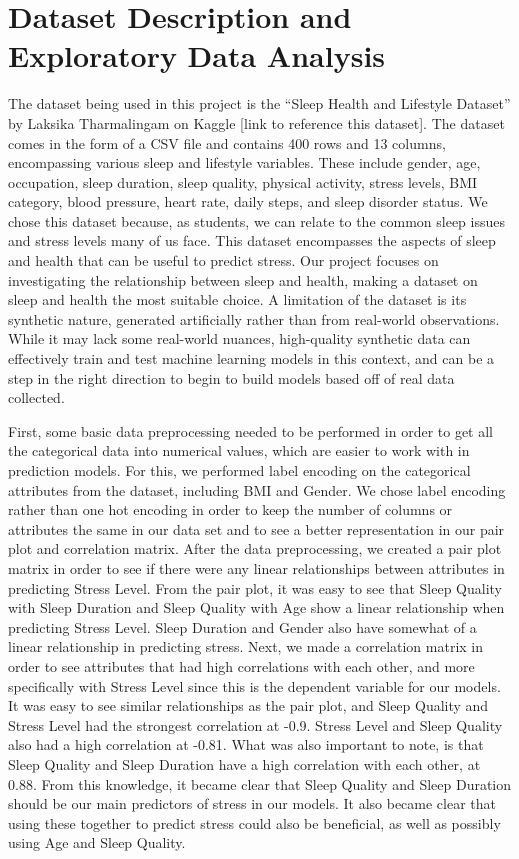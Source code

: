 \documentclass[11pt, letterpaper]{article}
\begin{document}
    \section*{Dataset Description and Exploratory Data Analysis}
    The dataset being used in this project is the “Sleep Health and Lifestyle Dataset” by Laksika Tharmalingam on Kaggle [link to reference this dataset]. The dataset comes in the form of a CSV file and contains 400 rows and 13 columns, encompassing various sleep and lifestyle variables. These include gender, age, occupation, sleep duration, sleep quality, physical activity, stress levels, BMI category, blood pressure, heart rate, daily steps, and sleep disorder status. We chose this dataset because, as students, we can relate to the common sleep issues and stress levels many of us face. This dataset encompasses the aspects of sleep and health that can be useful to predict stress. Our project focuses on investigating the relationship between sleep and health, making a dataset on sleep and health the most suitable choice. A limitation of the dataset is its synthetic nature, generated artificially rather than from real-world observations. While it may lack some real-world nuances, high-quality synthetic data can effectively train and test machine learning models in this context, and can be a step in the right direction to begin to build models based off of real data collected.

    First, some basic data preprocessing needed to be performed in order to get all the categorical data into numerical values, which are easier to work with in prediction models. For this, we performed label encoding on the categorical attributes from the dataset, including BMI and Gender. We chose label encoding rather than one hot encoding in order to keep the number of columns or attributes the same in our data set and to see a better representation in our pair plot and correlation matrix. After the data preprocessing, we created a pair plot matrix in order to see if there were any linear relationships between attributes in predicting Stress Level. From the pair plot, it was easy to see that Sleep Quality with Sleep Duration and Sleep Quality with Age show a linear relationship when predicting Stress Level. Sleep Duration and Gender also have somewhat of a linear relationship in predicting stress. Next, we made a correlation matrix in order to see attributes that had high correlations with each other, and more specifically with Stress Level since this is the dependent variable for our models. It was easy to see similar relationships as the pair plot, and Sleep Quality and Stress Level had the strongest correlation at -0.9. Stress Level and Sleep Quality also had a high correlation at -0.81. What was also important to note, is that Sleep Quality and Sleep Duration have a high correlation with each other, at 0.88. From this knowledge, it became clear that Sleep Quality and Sleep Duration should be our main predictors of stress in our models. It also became clear that using these together to predict stress could also be beneficial, as well as possibly using Age and Sleep Quality.
     
\end{document}
